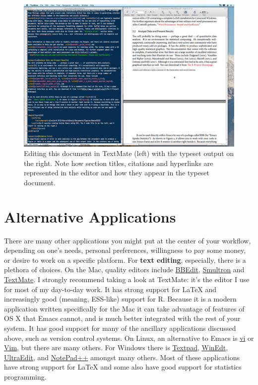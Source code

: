 \documentclass[11pt,article]{memoir}
\begin{document}
\begin{figure}[ht]
	\centering
		\includegraphics[scale=0.2]{figures/TextMateLaTeX}
	\caption{Editing this document in TextMate (left) with the typeset output on the right. Note how section titles, citations and hyperlinks are represented in the editor and how they appear in the typeset document.}
	\label{fig:label}
\end{figure}

\chapter{Alternative Applications}
There are many other applications you might put at the center of your workflow, depending on one's needs, personal preferences, willingness to pay some money, or desire to work on a specific platform. For \textbf{text editing}, especially, there is a plethora of choices. On the Mac, quality editors  include
\href{http://www.barebones.com/products/bbedit/index.shtml}{BBEdit}, \href{http://smultron.sourceforge.net/}{Smultron} and \href{http://macromates.com/}{TextMate}. I strongly recommend taking a look at TextMate: it's the editor I use for most of my day-to-day work. It has strong support for LaTeX and increasingly good (meaning, ESS-like) support for R. Because it is a modern application written specifically for the Mac it can take advantage of features of OS X that Emacs cannot, and is much better integrated with the rest of your system. It has good support for many of the ancillary applications discussed above, such as version control systems. On Linux, an alternative to Emacs is \href{http://www.eng.hawaii.edu/Tutor/vi.html}{vi} or \href{http://www.vim.org/}{Vim}, but there are many others. For Windows there is \href{http://www.textpad.com/}{Textpad}, \href{http://www.winedt.com/}{WinEdt}, \href{http://www.ultraedit.com/}{UltraEdit}, and \href{http://notepad-plus.sourceforge.net/uk/site.htm}{NotePad++} amongst many others. Most of these applications have strong support for LaTeX and some also have good support for statistics programming.
\end{document}
